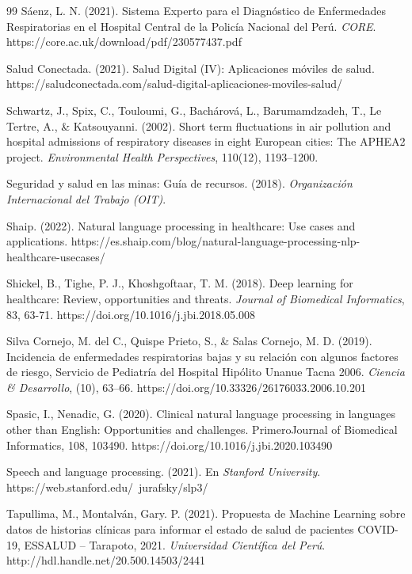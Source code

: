 \documentclass[12pt,a4paper]{article}
\begin{document}
\begin{thebibliography}{99}
Sáenz, L. N. (2021). Sistema Experto para el Diagnóstico de Enfermedades Respiratorias en el Hospital Central de la Policía Nacional del Perú. \textit{CORE}. https://core.ac.uk/download/pdf/230577437.pdf

Salud Conectada. (2021). Salud Digital (IV): Aplicaciones móviles de salud. https://saludconectada.com/salud-digital-aplicaciones-moviles-salud/

Schwartz, J., Spix, C., Touloumi, G., Bachárová, L., Barumamdzadeh, T., Le Tertre, A., \& Katsouyanni. (2002). Short term fluctuations in air pollution and hospital admissions of respiratory diseases in eight European cities: The APHEA2 project. \textit{Environmental Health Perspectives}, 110(12), 1193–1200.

Seguridad y salud en las minas: Guía de recursos. (2018). \textit{Organización Internacional del Trabajo (OIT)}.

Shaip. (2022). Natural language processing in healthcare: Use cases and applications. https://es.shaip.com/blog/natural-language-processing-nlp-healthcare-usecases/

Shickel, B., Tighe, P. J., Khoshgoftaar, T. M. (2018). Deep learning for healthcare: Review, opportunities and threats. \textit{Journal of Biomedical Informatics}, 83, 63-71. https://doi.org/10.1016/j.jbi.2018.05.008

Silva Cornejo, M. del C., Quispe Prieto, S., \& Salas Cornejo, M. D. (2019). Incidencia de enfermedades respiratorias bajas y su relación con algunos factores de riesgo, Servicio de Pediatría del Hospital Hipólito Unanue Tacna 2006. \textit{Ciencia \& Desarrollo}, (10), 63–66. https://doi.org/10.33326/26176033.2006.10.201

Spasic, I., Nenadic, G. (2020). Clinical natural language processing in languages other than English: Opportunities and challenges. Primero{Journal of Biomedical Informatics}, 108, 103490. https://doi.org/10.1016/j.jbi.2020.103490

Speech and language processing. (2021). En \textit{Stanford University}. https://web.stanford.edu/~jurafsky/slp3/

Tapullima, M., Montalván, Gary. P. (2021). Propuesta de Machine Learning sobre datos de historias clínicas para informar el estado de salud de pacientes COVID-19, ESSALUD – Tarapoto, 2021. \textit{Universidad Científica del Perú}. http://hdl.handle.net/20.500.14503/2441


\end{thebibliography}
\end{document}

